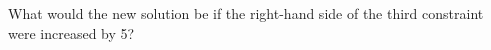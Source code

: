 What would the new solution be if the right-hand side of the third constraint were increased by 5?

\begin{solution}
  \ \\
  \vfill
\end{solution}

